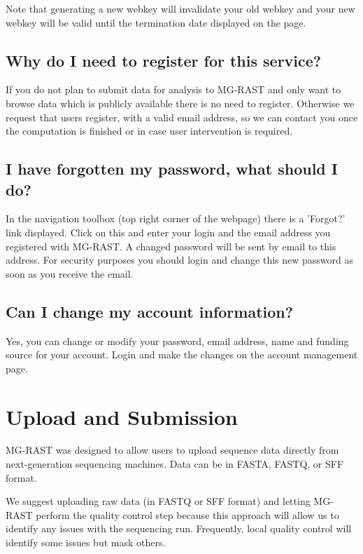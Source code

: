 \documentclass[letterpaper,10pt,english]{sphinxmanual}
\begin{document}
Note that generating a new webkey will invalidate your old webkey and
your new webkey will be valid until the termination date displayed on
the page.


\subsection{Why do I need to register for this service?}
\label{\detokenize{faq:why-do-i-need-to-register-for-this-service}}
If you do not plan to submit data for analysis to MG-RAST and only want
to browse data which is publicly available there is no need to register.
Otherwise we request that users register, with a valid email address, so
we can contact you once the computation is finished or in case user
intervention is required.


\subsection{I have forgotten my password, what should I do?}
\label{\detokenize{faq:i-have-forgotten-my-password-what-should-i-do}}
In the navigation toolbox (top right corner of the webpage) there is a
’Forgot?’ link displayed. Click on this and enter your login and the
email address you registered with MG-RAST. A changed password will be
sent by email to this address. For security purposes you should login
and change this new password as soon as you receive the email.


\subsection{Can I change my account information?}
\label{\detokenize{faq:can-i-change-my-account-information}}
Yes, you can change or modify your password, email address, name and
funding source for your account. Login and make the changes on the
account management page.


\section{Upload and Submission}
\label{\detokenize{faq:upload-and-submission}}\label{\detokenize{faq:section-uploading-to-mg-rast}}
MG-RAST was designed to allow users to upload sequence data directly
from next-generation sequencing machines. Data can be in FASTA, FASTQ,
or SFF format.

We suggest uploading raw data (in FASTQ or SFF format) and letting
MG-RAST perform the quality control step because this approach will
allow us to identify any issues with the sequencing run. Frequently,
local quality control will identify some issues but mask others.
\end{document}
